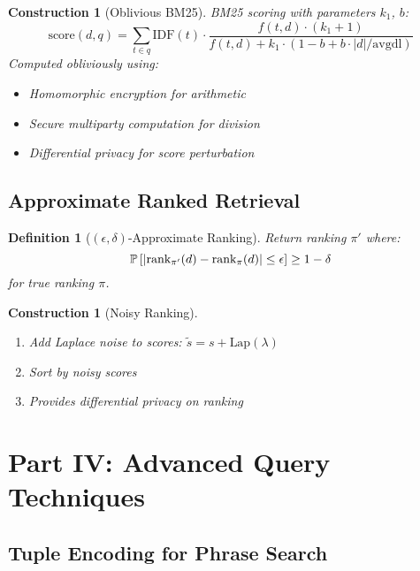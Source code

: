 \documentclass[11pt,final,hidelinks]{article}
\newtheorem{definition}[theorem]{Definition}
\newtheorem{construction}[theorem]{Construction}
\begin{document}
\begin{construction}[Oblivious BM25]
BM25 scoring with parameters $k_1$, $b$:
\begin{equation}
\text{score}(d, q) = \sum_{t \in q} \text{IDF}(t) \cdot \frac{f(t, d) \cdot (k_1 + 1)}{f(t, d) + k_1 \cdot (1 - b + b \cdot |d|/\text{avgdl})}
\end{equation}
Computed obliviously using:
\begin{itemize}
    \item Homomorphic encryption for arithmetic
    \item Secure multiparty computation for division
    \item Differential privacy for score perturbation
\end{itemize}
\end{construction}

\subsection{Approximate Ranked Retrieval}

\begin{definition}[$(\epsilon, \delta)$-Approximate Ranking]
Return ranking $\pi'$ where:
\begin{equation}
\mathbb{P}\left[|\text{rank}_{\pi'}(d) - \text{rank}_{\pi}(d)| \leq \epsilon\right] \geq 1 - \delta
\end{equation}
for true ranking $\pi$.
\end{definition}

\begin{construction}[Noisy Ranking]
\begin{enumerate}
    \item Add Laplace noise to scores: $\tilde{s} = s + \text{Lap}(\lambda)$
    \item Sort by noisy scores
    \item Provides differential privacy on ranking
\end{enumerate}
\end{construction}

\section{Part IV: Advanced Query Techniques}

\subsection{Tuple Encoding for Phrase Search}
\end{document}

